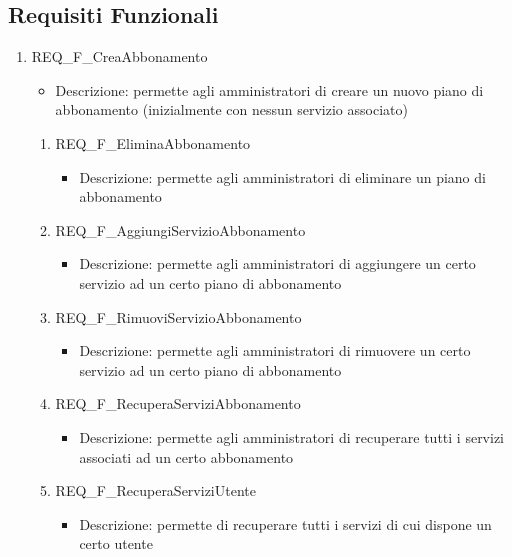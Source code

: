 

\subsection{Requisiti Funzionali}
\begin{enumerate}
	

	\item REQ\_F\_CreaAbbonamento
		\begin{itemize}	
			\item Descrizione: permette agli amministratori di creare un nuovo piano di abbonamento (inizialmente con nessun servizio associato)
		\end{itemize}
		\begin{enumerate}[label*=\arabic*.]      
			\item REQ\_F\_EliminaAbbonamento
			\begin{itemize}	
				\item Descrizione: permette agli amministratori di eliminare un piano di abbonamento
			\end{itemize}
			
			\item REQ\_F\_AggiungiServizioAbbonamento
			\begin{itemize}	
				\item Descrizione: permette agli amministratori di aggiungere un certo servizio ad un certo piano di abbonamento
			\end{itemize}
	
			\item REQ\_F\_RimuoviServizioAbbonamento
			\begin{itemize}	
				\item Descrizione: permette agli amministratori di rimuovere un certo servizio ad un certo piano di abbonamento
			\end{itemize}

			\item REQ\_F\_RecuperaServiziAbbonamento
			\begin{itemize}	
				\item Descrizione: permette agli amministratori di recuperare tutti i servizi associati ad un certo abbonamento
			\end{itemize}
	
			\item REQ\_F\_RecuperaServiziUtente
			\begin{itemize}	
				\item Descrizione: permette di recuperare tutti i servizi di cui dispone un certo utente
			\end{itemize}


\end{enumerate}
\end{enumerate}
